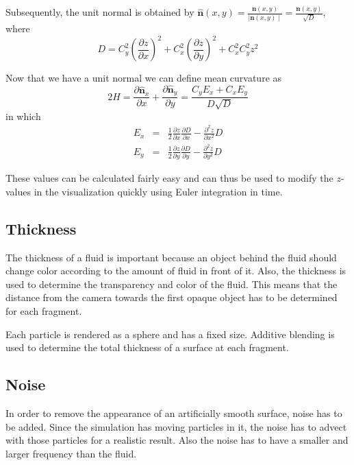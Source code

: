 Subsequently, the unit normal is obtained by \(\hat{\mathbf{n}}(x,y) = \frac{\mathbf{n}(x,y)}{\mid \mathbf{n}(x,y)\mid} = \frac{\mathbf{n}(x,y)}{\sqrt{D}}\), where 
\begin{equation}
	\label{eq:D}
	D = C_y^2 \left(\frac{\partial z}{\partial x}\right)^2 + C_x^2 \left(\frac{\partial z}{\partial y}\right)^2 + C_x^2 C_y^2 z^2
\end{equation}

Now that we have a unit normal we can define mean curvature as 
\begin{equation}
	\label{eq:curvy}
	2H = \frac{\partial \hat{\mathbf{n}}_x}{\partial x} + \frac{\partial\hat{\mathbf{n}}_y}{\partial y} = \frac{C_y E_x + C_x E_y}{D\sqrt{D}}
\end{equation}
in which
\begin{eqnarray}
	E_x &=& \frac{1}{2}\frac{\partial z}{\partial x}\frac{\partial D}{\partial x} - \frac{\partial^2z}{\partial x^2}D\\
	E_y &=& \frac{1}{2}\frac{\partial z}{\partial y}\frac{\partial D}{\partial y} - \frac{\partial^2z}{\partial y^2}D
\end{eqnarray}

These values can be calculated fairly easy and can thus be used to modify the \(z\)-values in the visualization quickly using Euler integration in time.

\subsection{Thickness}
The thickness of a fluid is important because an object behind the fluid should change color according to the amount of fluid in front of it.
Also, the thickness is used to determine the transparency and color of the fluid.
This means that the distance from the camera towards the first opaque object has to be determined for each fragment.

Each particle is rendered as a sphere and has a fixed size.
Additive blending is used to determine the total thickness of a surface at each fragment.

\subsection{Noise}
In order to remove the appearance of an artificially smooth surface, noise has to be added.
Since the simulation has moving particles in it, the noise has to advect with those particles for a realistic result.
Also the noise has to have a smaller and larger frequency than the fluid.

